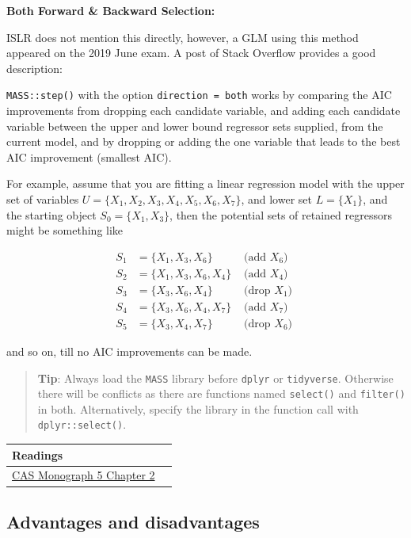 \documentclass[]{book}
\begin{document}
\textbf{Both Forward \& Backward Selection:}

ISLR does not mention this directly, however, a GLM using this method appeared on the 2019 June exam. A post of Stack Overflow provides a good description:

\texttt{MASS::step()} with the option \texttt{direction\ =\ \textquotesingle{}both\textquotesingle{}} works by comparing the AIC improvements from
dropping each candidate variable, and adding each candidate variable between the upper and lower bound regressor sets supplied,
from the current model, and by dropping or adding the one variable that leads to the best AIC improvement (smallest AIC).

For example, assume that you are fitting a linear regression model with the upper set of variables \(U = \{X_1, X_2, X_3, X_4, X_5, X_6, X_7\}\), and lower set \(L = \{X_1\}\), and the starting object \(S_0 = \{X_1, X_3\}\), then the potential sets of retained regressors might be something like

\[
\begin{align}
S_1 &= \{X_1, X_3, X_6\} &\text{  (add $X_6$)  }\\
S_2 &= \{X_1, X_3, X_6, X_4\} &\text{  (add $X_4$)  }\\
S_3 &= \{X_3, X_6, X_4\} &\text{  (drop $X_1$)  }\\
S_4 &= \{X_3, X_6, X_4, X_7\} &\text{  (add $X_7$)  }\\
S_5 &= \{X_3, X_4, X_7\} &\text{  (drop $X_6$)  }
\end{align}
\]

and so on, till no AIC improvements can be made.

\begin{quote}
\textbf{Tip}: Always load the \texttt{MASS} library before \texttt{dplyr} or \texttt{tidyverse}. Otherwise there will be conflicts as there are functions named \texttt{select()} and \texttt{filter()} in both. Alternatively, specify the library in the function call with \texttt{dplyr::select()}.
\end{quote}

\begin{longtable}[]{@{}ll@{}}
\toprule
Readings &\tabularnewline
\midrule
\endhead
\href{https://www.casact.org/pubs/monographs/papers/05-Goldburd-Khare-Tevet.pdf}{CAS Monograph 5 Chapter 2} &\tabularnewline
\bottomrule
\end{longtable}

\hypertarget{advantages-and-disadvantages}{%
\subsection{Advantages and disadvantages}\label{advantages-and-disadvantages}}
\end{document}
